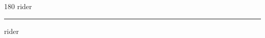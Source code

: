 
\begin{frame}
\begin{center}
\begin{turn}{180}
{\fontsize{2.5cm}{1em}\selectfont rider}
\end{turn}
\vspace{1em}\par  
\hrule
\vspace{1em}\par  
{\fontsize{2.5cm}{1em}\selectfont rider}
\end{center}
\end{frame}
